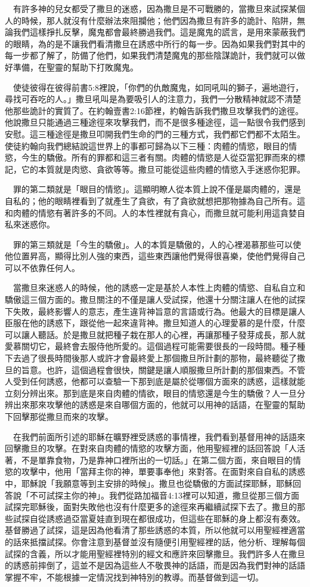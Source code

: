 \documentclass{book}
\begin{document}
　有許多神的兒女都受了撒旦的迷惑，因為撒旦是不可戰勝的，當撒旦來試探某個人的時候，那人就沒有什麼辦法來阻攔他；他們因為撒旦有許多的詭計、陷阱，無論我們這樣掙扎反擊，魔鬼都會最終勝過我們。這是魔鬼的謊言，是用來蒙蔽我們的眼睛，為的是不讓我們看清撒旦在誘惑中所行的每一步。因為如果我們對其中的每一步都了解了，防備了他們，如果我們清楚魔鬼的那些陰謀詭計，我們就可以做好準備，在聖靈的幫助下打敗魔鬼。

　使徒彼得在彼得前書5:8裡說，「你們的仇敵魔鬼，如同吼叫的獅子，遍地遊行，尋找可吞吃的人。」撒旦吼叫是為要吸引人的注意力，我們一分散精神就認不清楚他那些詭計的實質了。在約翰壹書2:16節裡，約翰告訴我們撒旦攻擊我們的途徑。他說撒旦只能通過三種途徑來攻擊我們，而不是很多種途徑，這一點很令我們感到安慰。這三種途徑是撒旦叩開我們生命的門的三種方式，我們都它們都不太陌生。使徒約翰向我們總結說這世界上的事都可歸為以下三種：肉體的情慾，眼目的情慾，今生的驕傲。所有的罪都和這三者有關。肉體的情慾是人從亞當犯罪而來的標記，它的本質就是肉慾、貪欲等等。撒旦可能從這些肉體的情慾入手迷惑你犯罪。

　罪的第二類就是「眼目的情慾」。這顯明瞭人從本質上說不僅是屬肉體的，還是自私的；他的眼睛裡看到了就產生了貪欲，有了貪欲就想把那物據為自己所有。這和肉體的情慾有著許多的不同。人的本性裡就有貪心，而撒旦就可能利用這貪婪自私來迷惑你。

　罪的第三類就是「今生的驕傲」。人的本質是驕傲的，人的心裡渴慕那些可以使他位置昇高，顯得比別人強的東西，這些東西讓他們覺得很喜樂，使他們覺得自己可以不依靠任何人。

　當撒旦來迷惑人的時候，他的誘惑一定是基於人本性上肉體的情慾、自私自立和驕傲這三個方面的。撒旦關注的不僅是讓人受試探，他還十分關注讓人在他的試探下失敗，最終影響人的意志，產生違背神旨意的言語或行為。他最大的目標是讓人臣服在他的誘惑下，跟從他一起來違背神。撒旦知道人的心理愛慕的是什麼，什麼可以讓人聽話。於是撒旦就把種子栽在那人的心裡，再讓那種子發芽成長，那人就愛慕關切它，最終會去服侍他所愛的。這個過程可能需要很長的一段時間。種子種下去過了很長時間後那人或許才會最終愛上那個撒旦所計劃的那物，最終聽從了撒旦的旨意。也許，這個過程會很快，關鍵是讓人順服撒旦所計劃的那個東西。不管人受到任何誘惑，他都可以查驗一下那到底是屬於從哪個方面來的誘惑，這樣就能立刻分辨出來。那到底是來自肉體的情欲，眼目的情慾還是今生的驕傲？人一旦分辨出來那來攻擊他的誘惑是來自哪個方面的，他就可以用神的話語，在聖靈的幫助下回擊那從撒旦而來的攻擊。

　在我們前面所引述的耶穌在曠野裡受誘惑的事情裡，我們看到基督用神的話語來回擊撒旦的攻擊。在對來自肉體的情慾的攻擊方面，他用聖經裡的話回答說「人活著，不是單靠食物，乃是靠神口裡所出的一切話。」在第二個方面，來自眼目的情慾的攻擊中，他用「當拜主你的神，單要事奉他」來對答。在面對來自自私的誘惑中，耶穌說「我願意等到主安排的時候」。撒旦也從驕傲的方面試探耶穌，耶穌回答說「不可試探主你的神」。我們從路加福音4:13裡可以知道，撒旦從那三個方面試探完耶穌後，面對失敗他也沒有什麼更多的途徑來再繼續試探下去了。撒旦的那些試探自從誘惑過亞當夏娃直到現在都很成功，但這些在耶穌的身上都沒有奏效。基督勝過了試探，這是因為他看清了那些誘惑的本質，所以他就可以用聖經裡適當的話來抵擋試探。你會注意到基督並沒有隨便引用聖經裡的話，他分析、理解每個試探的含義，所以才能用聖經裡特別的經文和應許來回擊撒旦。我們許多人在撒旦的誘惑前摔倒了，這並不是因為這些人不敬畏神的話語，而是因為我們對神的話語掌握不牢，不能根據一定情況找到神特別的教導。而基督做到這一切。
\end{document}
